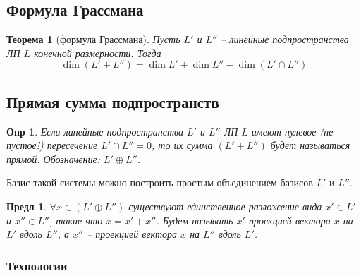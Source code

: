 \documentclass[a4paper,12pt]{article}
\newtheorem*{definition}{Опр}
\newtheorem{theorem}{Теорема}[section]
\newtheorem{propos}{Предл}[section]
\begin{document}
\subsection{Формула Грассмана}
\begin{theorem}[формула Грассмана]
	Пусть $L'$ и $L''$ -- линейные подпространства ЛП $L$ конечной размерности. Тогда
	\[
		\dim(L' + L'') = \dim L' + \dim L'' - \dim (L' \cap L'')
	\]
\end{theorem}

\subsection{Прямая сумма подпространств}

\begin{definition}
	Если линейные подпространства $L'$ и $L''$ ЛП $L$ имеют нулевое (не пустое!) пересечение $L' \cap L'' = 0$, то их сумма $(L' + L'')$ будет называться прямой. Обозначение: $L' \oplus L''$.
\end{definition}

Базис такой системы можно построить простым объединением базисов $L'$ и $L''$.

\begin{propos}
	$\forall x \in (L' \oplus L'')$ существуют единственное разложение вида $x' \in L'$ и $x'' \in L''$, такие что $x = x' + x''$. Будем называть $x'$ проекцией вектора $x$ на $L'$ вдоль $L''$, а $x''$ -- проекцией вектора $x$ на $L''$ вдоль $L'$.
\end{propos}

\subsubsection{Технологии}
\end{document}

